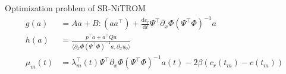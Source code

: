 \documentclass[presentation]{beamer}
\begin{document}
\begin{frame}[label={sec:org1047fb6}]{Optimization problem of SR-NiTROM}
\begin{subequations}
\begin{align}
g(a) &= Aa + B:(aa^{\top}) + \frac{\mathrm{d}c_{r}}{\mathrm{d}t}\Psi^{\top}\partial_{x}\Phi(\Psi^{\top}\Phi)^{-1}a\\
h(a) &= \frac{p^{\top}a + a^{\top}Qa}{\langle\partial_{x}\Phi(\Psi^{\top}\Phi)^{-1}a, \partial_{x}u_{0}\rangle}\\
\mu_{m}(t) &= \lambda_{m}^{\top}(t)\Psi^{\top}\partial_{x}\Phi(\Psi^{\top}\Phi)^{-1}a(t) - 2\beta(c_{r}(t_{m}) - c(t_{m}))
\end{align}
\end{subequations}
\end{frame}
\end{document}
